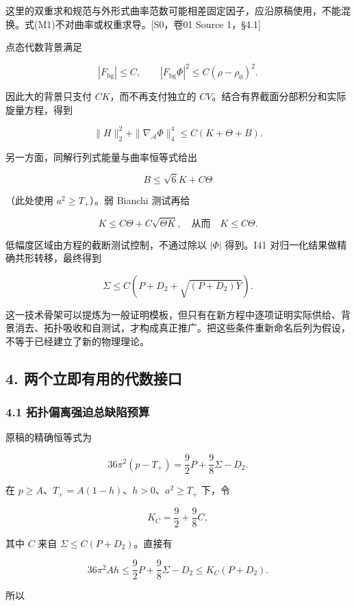 \documentclass[UTF8,a4paper,11pt,fontset=fandol]{ctexart}
\begin{document}
这里的双重求和规范与外形式曲率范数可能相差固定因子，应沿原稿使用，不能混换。式(M1)不对曲率或权重求导。{[}S0，卷01
Source 1，§4.1{]}

点态代数背景满足

\[
|F_{\mathrm{bg}}|\le C,\qquad
|F_{\mathrm{bg}}\Phi|^2\le C(\rho-\rho_0)^2.
\]

因此大的背景只支付 \(CK\)，而不再支付独立的
\(CV\)。结合有界截面分部积分和实际旋量方程，得到

\[
\|H\|_2^2+\|\nabla_{\mathcal A}\Phi\|_4^4
\le C(K+\Theta+B).
\tag{M2}
\]

另一方面，同解行列式能量与曲率恒等式给出

\[
B\le\sqrt6K+C\Theta
\tag{M3}
\]

（此处使用 \(a^2\ge T_+\)）。弱 Bianchi 测试再给

\[
K\le C\Theta+C\sqrt{\Theta K},
\quad\text{从而}\quad K\le C\Theta.
\tag{M4}
\]

低幅度区域由方程的截断测试控制，不通过除以 \(|\Phi|\) 得到。I41
对归一化结果做精确共形转移，最终得到

\[
\Sigma\le C\left(P+D_2+\sqrt{(P+D_2)Y}\right).
\tag{M5}
\]

这一技术骨架可以提炼为一般证明模板，但只有在新方程中逐项证明实际供给、背景消去、拓扑吸收和自测试，才构成真正推广。把这些条件重新命名后列为假设，不等于已经建立了新的物理理论。

\subsection{4.
两个立即有用的代数接口}\label{ux4e24ux4e2aux7acbux5373ux6709ux7528ux7684ux4ee3ux6570ux63a5ux53e3}

\subsubsection{4.1
拓扑偏离强迫总缺陷预算}\label{ux62d3ux6251ux504fux79bbux5f3aux8febux603bux7f3aux9677ux9884ux7b97}

原稿的精确恒等式为

\[
36\pi^2(p-T_+)=\frac92P+\frac98\Sigma-D_2.
\tag{M6}
\]

在 \(p\ge A\)、\(T_+=A(1-h)\)、\(h>0\)、\(a^2\ge T_+\) 下，令

\[
K_C=\frac92+\frac98C,
\]

其中 \(C\) 来自 \(\Sigma\le C(P+D_2)\)。直接有

\[
36\pi^2Ah\le\frac92P+\frac98\Sigma-D_2
\le K_C(P+D_2).
\]

所以
\end{document}

